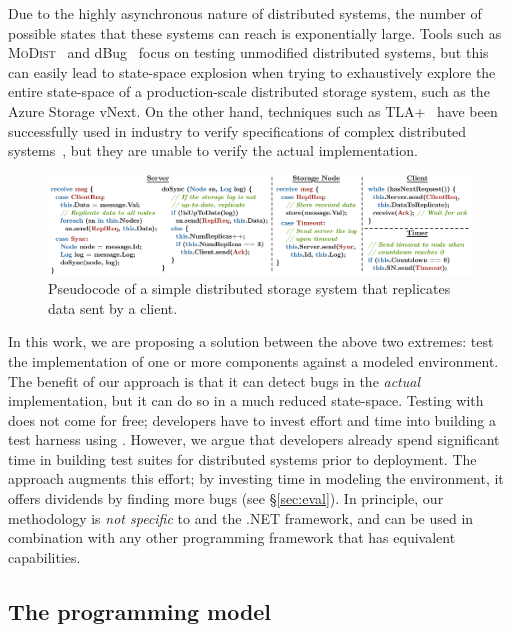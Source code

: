 Due to the highly asynchronous nature of distributed systems, the number of possible states that these systems can reach is exponentially large. Tools such as \textsc{MoDist}~\cite{yang2009modist} and dBug~\cite{simsa2011dbug} focus on testing unmodified distributed systems, but this can easily lead to state-space explosion when trying to exhaustively explore the entire state-space of a production-scale distributed storage system, such as the Azure Storage vNext. On the other hand, techniques such as TLA+~\cite{lamport1994temporal} have been successfully used in industry to verify specifications of complex distributed systems~\cite{newcombe2015aws}, but they are unable to verify the actual implementation.

\begin{figure}[t]
\centering
\includegraphics[width=\linewidth]{img/example_code}
\vspace{-7mm}
\caption{Pseudocode of a simple distributed storage system that replicates data sent by a client.}
\label{fig:example}
\vspace{-2mm}
\end{figure}

In this work, we are proposing a solution between the above two extremes: test the implementation of one or more components against a modeled \psharp environment. The benefit of our approach is that it can detect bugs in the \emph{actual} implementation, but it can do so in a much reduced state-space. Testing with \psharp does not come for free; developers have to invest effort and time into building a test harness using \psharp. However, we argue that developers already spend significant time in building test suites for distributed systems prior to deployment. The \psharp approach augments this effort; by investing time in modeling the environment, it offers dividends by finding more bugs (see \S\ref{sec:eval}). In principle, our methodology is \emph{not specific} to \psharp and the .NET framework, and can be used in combination with any other programming framework that has equivalent capabilities.

\vspace{-2mm}
\subsection{The \psharp programming model}
\label{sec:overview:psharp}

